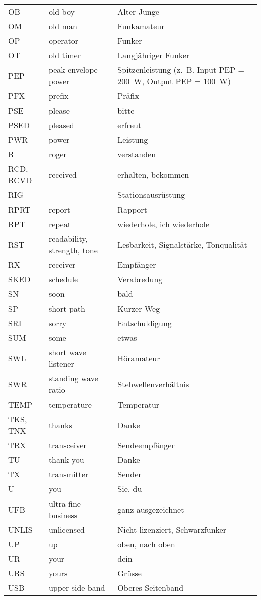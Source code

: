 \begin{tabular}{lll}
OB & old boy & Alter Junge \\
OM & old man & Funkamateur \\
OP & operator & Funker \\
OT & old timer & Langjähriger Funker \\
PEP & peak envelope power & Spitzenleistung (z. B. Input PEP = 200 W, Output PEP = 100 W) \\
PFX & prefix & Präfix \\
PSE & please & bitte \\
PSED & pleased & erfreut \\
PWR & power & Leistung \\
R & roger & verstanden \\
RCD, RCVD & received & erhalten, bekommen \\
RIG &  & Stationsausrüstung \\
RPRT & report & Rapport \\
RPT & repeat & wiederhole, ich wiederhole \\
RST & readability, strength, tone & Lesbarkeit, Signalstärke, Tonqualität \\
RX & receiver & Empfänger \\
SKED & schedule & Verabredung \\
SN & soon & bald \\
SP & short path & Kurzer Weg \\
SRI & sorry & Entschuldigung \\
SUM & some & etwas \\
SWL & short wave listener & Höramateur \\
SWR & standing wave ratio & Stehwellenverhältnis \\
TEMP & temperature & Temperatur \\
TKS, TNX & thanks & Danke \\
TRX & transceiver & Sendeempfänger \\
TU & thank you & Danke \\
TX & transmitter & Sender \\
U & you & Sie, du \\
UFB & ultra fine business & ganz ausgezeichnet \\
UNLIS & unlicensed & Nicht lizenziert, Schwarzfunker \\
UP & up & oben, nach oben \\
UR & your & dein \\
URS & yours & Grüsse \\
USB & upper side band & Oberes Seitenband \\

\end{tabular}
